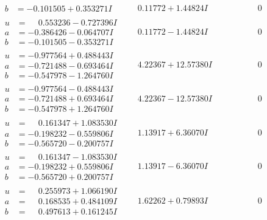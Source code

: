 \documentclass[1p]{elsarticle_modified}
\theoremstyle{definition}
\begin{document}
$$\begin{array}{c|c|c}
\begin{aligned}
b &= -0.101505 + 0.353271 I\end{aligned}
 & \phantom{-}0.11772 + 1.44824 I & \phantom{-0.000000 } 0 \\ \hline\begin{aligned}
u &= \phantom{-}0.553236 - 0.727396 I \\
a &= -0.386426 - 0.064707 I \\
b &= -0.101505 - 0.353271 I\end{aligned}
 & \phantom{-}0.11772 - 1.44824 I & \phantom{-0.000000 } 0 \\ \hline\begin{aligned}
u &= -0.977564 + 0.488443 I \\
a &= -0.721488 - 0.693464 I \\
b &= -0.547978 - 1.264760 I\end{aligned}
 & \phantom{-}4.22367 + 12.57380 I & \phantom{-0.000000 } 0 \\ \hline\begin{aligned}
u &= -0.977564 - 0.488443 I \\
a &= -0.721488 + 0.693464 I \\
b &= -0.547978 + 1.264760 I\end{aligned}
 & \phantom{-}4.22367 - 12.57380 I & \phantom{-0.000000 } 0 \\ \hline\begin{aligned}
u &= \phantom{-}0.161347 + 1.083530 I \\
a &= -0.198232 - 0.559806 I \\
b &= -0.565720 - 0.200757 I\end{aligned}
 & \phantom{-}1.13917 + 6.36070 I & \phantom{-0.000000 } 0 \\ \hline\begin{aligned}
u &= \phantom{-}0.161347 - 1.083530 I \\
a &= -0.198232 + 0.559806 I \\
b &= -0.565720 + 0.200757 I\end{aligned}
 & \phantom{-}1.13917 - 6.36070 I & \phantom{-0.000000 } 0 \\ \hline\begin{aligned}
u &= \phantom{-}0.255973 + 1.066190 I \\
a &= \phantom{-}0.168535 + 0.484109 I \\
b &= \phantom{-}0.497613 + 0.161245 I\end{aligned}
 & \phantom{-}1.62262 + 0.79893 I & \phantom{-0.000000 } 0 \\ \hline\begin{aligned}

\end{aligned}
\end{array}$$
\end{document}
